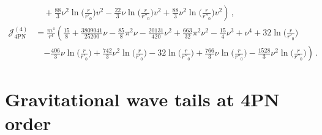 \documentclass[prd,preprint,superscriptaddress,tightenlines,nofootinbib,
  eqsecnum,showpacs]{revtex4}
\begin{document}
\begin{subequations}
\begin{align}
&\left. \quad + \frac{88}{3} \nu^2 \ln\Big(\frac{r}{r'_{0}}\Big) v^{2}
 -  \frac{22}{3} \nu \ln\Big(\frac{r}{r''_{0}}\Big) v^{2}
 + \frac{88}{3} \nu^2 \ln\Big(\frac{r}{r''_{0}}\Big) v^{2}\right) \,,\\
\mathcal{J}^{(4)}_\text{4PN} &= \frac{m^4}{r^4} \left(\frac{15}{8}
 + \frac{3809041}{25200} \nu
 -  \frac{85}{8} \pi^2 \nu
 -  \frac{20131}{420} \nu^2
 + \frac{663}{32} \pi^2 \nu^2
 -  \frac{15}{4} \nu^3
 + \nu^4
 + 32 \ln\Big(\frac{r}{r'_{0}}\Big) \right.\nonumber\\
&\quad\left. -  \frac{406}{3} \nu \ln\Big(\frac{r}{r'_{0}}\Big)
 + \frac{742}{3} \nu^2 \ln\Big(\frac{r}{r'_{0}}\Big)
 - 32 \ln\Big(\frac{r}{r''_{0}}\Big)
 + \frac{766}{3} \nu \ln\Big(\frac{r}{r''_{0}}\Big)
 -  \frac{1528}{3} \nu^2 \ln\Big(\frac{r}{r''_{0}}\Big)\right) \,.
\end{align}\end{subequations}
%

\section{Gravitational wave tails at 4PN order} 
\label{sec:tails} 
\end{document}
